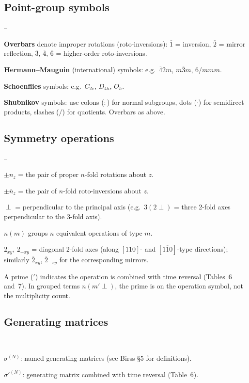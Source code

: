 \documentclass[a4paper,11pt]{article}
\newcommand{\ob}[1]{\overline{#1}}
\newcommand{\sg}[1]{\sigma^{(#1)}}
\newcommand{\sgp}[1]{\sigma'^{(#1)}}
\newenvironment{notelist}{%
  \begin{list}{--}{%
    \setlength{\topsep}{2pt}%
    \setlength{\itemsep}{1pt}%
    \setlength{\parsep}{0pt}%
    \setlength{\leftmargin}{1.5em}%
  }%
}{\end{list}}
\begin{document}
\subsection*{Point-group symbols}
\begin{notelist}
\item \textbf{Overbars} denote improper rotations (roto-inversions):
  $\ob{1}$ = inversion, $\ob{2}$ = mirror reflection,
  $\ob{3}$, $\ob{4}$, $\ob{6}$ = higher-order roto-inversions.
\item \textbf{Hermann--Mauguin} (international) symbols: e.g.\ $\ob{4}2m$,
  $m\ob{3}m$, $6/mmm$.
\item \textbf{Schoenflies} symbols: e.g.\ $C_{2v}$, $D_{4h}$, $O_h$.
\item \textbf{Shubnikov} symbols: use colons ($:$) for normal subgroups, dots
  ($\cdot$) for semidirect products, slashes ($/$) for quotients. Overbars as above.
\end{notelist}

\subsection*{Symmetry operations}
\begin{notelist}
\item $\pm n_z$ = the pair of proper $n$-fold rotations about $z$.
\item $\pm\ob{n}_z$ = the pair of $n$-fold roto-inversions about $z$.
\item $\perp$ = perpendicular to the principal axis (e.g.\ $3(2{\perp})$ =
  three 2-fold axes perpendicular to the 3-fold axis).
\item $n(m)$ groups $n$ equivalent operations of type $m$.
\item $2_{xy}$, $2_{-xy}$ = diagonal 2-fold axes (along $[110]$- and
  $[1\ob{1}0]$-type directions); similarly $\ob{2}_{xy}$, $\ob{2}_{-xy}$ for
  the corresponding mirrors.
\item A prime ($'$) indicates the operation is combined with time reversal
  (Tables~6 and~7). In grouped terms $n(m'{\perp})$, the prime is on the
  operation symbol, not the multiplicity count.
\end{notelist}

\subsection*{Generating matrices}
\begin{notelist}
\item $\sg{N}$: named generating matrices (see Birss \S5 for definitions).
\item $\sgp{N}$: generating matrix combined with time reversal (Table~6).
\end{notelist}
\end{document}
